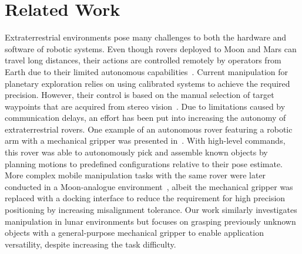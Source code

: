 \section{Related Work}\label{sec:related-work}

Extraterrestrial environments pose many challenges to both the hardware and software of robotic systems. Even though rovers deployed to Moon and Mars can travel long distances, their actions are controlled remotely by operators from Earth due to their limited autonomous capabilities~\cite{grotzinger_mars_2012}. Current manipulation for planetary exploration relies on using calibrated systems to achieve the required precision. However, their control is based on the manual selection of target waypoints that are acquired from stereo vision~\cite{nickels_vision_2010}. Due to limitations caused by communication delays, an effort has been put into increasing the autonomy of extraterrestrial rovers. One example of an autonomous rover featuring a robotic arm with a mechanical gripper was presented in~\cite{schuster_lru_2016}. With high-level commands, this rover was able to autonomously pick and assemble known objects by planning motions to predefined configurations relative to their pose estimate. More complex mobile manipulation tasks with the same rover were later conducted in a Moon-analogue environment~\cite{lehner_mobile_2018}, albeit the mechanical gripper was replaced with a docking interface to reduce the requirement for high precision positioning by increasing misalignment tolerance. Our work similarly investigates manipulation in lunar environments but focuses on grasping previously unknown objects with a general-purpose mechanical gripper to enable application versatility, despite increasing the task difficulty.

